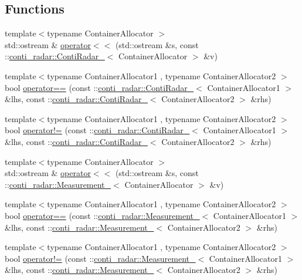\subsection*{Functions}
\begin{DoxyCompactItemize}
\item 
{\footnotesize template$<$typename Container\+Allocator $>$ }\\std\+::ostream \& \hyperlink{namespaceconti__radar_a45fbce01f8d975cd105ce47904567933}{operator$<$$<$} (std\+::ostream \&s, const \+::\hyperlink{structconti__radar_1_1ContiRadar__}{conti\+\_\+radar\+::\+Conti\+Radar\+\_\+}$<$ Container\+Allocator $>$ \&v)
\item 
{\footnotesize template$<$typename Container\+Allocator1 , typename Container\+Allocator2 $>$ }\\bool \hyperlink{namespaceconti__radar_a02b979557924ab172d8ffb8c385a04e4}{operator==} (const \+::\hyperlink{structconti__radar_1_1ContiRadar__}{conti\+\_\+radar\+::\+Conti\+Radar\+\_\+}$<$ Container\+Allocator1 $>$ \&lhs, const \+::\hyperlink{structconti__radar_1_1ContiRadar__}{conti\+\_\+radar\+::\+Conti\+Radar\+\_\+}$<$ Container\+Allocator2 $>$ \&rhs)
\item 
{\footnotesize template$<$typename Container\+Allocator1 , typename Container\+Allocator2 $>$ }\\bool \hyperlink{namespaceconti__radar_a655b3a6c63e06866d91dc3f1947631e2}{operator!=} (const \+::\hyperlink{structconti__radar_1_1ContiRadar__}{conti\+\_\+radar\+::\+Conti\+Radar\+\_\+}$<$ Container\+Allocator1 $>$ \&lhs, const \+::\hyperlink{structconti__radar_1_1ContiRadar__}{conti\+\_\+radar\+::\+Conti\+Radar\+\_\+}$<$ Container\+Allocator2 $>$ \&rhs)
\item 
{\footnotesize template$<$typename Container\+Allocator $>$ }\\std\+::ostream \& \hyperlink{namespaceconti__radar_a0d0d9b62186db990827f43426ec8aa39}{operator$<$$<$} (std\+::ostream \&s, const \+::\hyperlink{structconti__radar_1_1Measurement__}{conti\+\_\+radar\+::\+Measurement\+\_\+}$<$ Container\+Allocator $>$ \&v)
\item 
{\footnotesize template$<$typename Container\+Allocator1 , typename Container\+Allocator2 $>$ }\\bool \hyperlink{namespaceconti__radar_a51b035c16eb15a241d4ef92bc689932a}{operator==} (const \+::\hyperlink{structconti__radar_1_1Measurement__}{conti\+\_\+radar\+::\+Measurement\+\_\+}$<$ Container\+Allocator1 $>$ \&lhs, const \+::\hyperlink{structconti__radar_1_1Measurement__}{conti\+\_\+radar\+::\+Measurement\+\_\+}$<$ Container\+Allocator2 $>$ \&rhs)
\item 
{\footnotesize template$<$typename Container\+Allocator1 , typename Container\+Allocator2 $>$ }\\bool \hyperlink{namespaceconti__radar_ae82ecbb25e59ba5d52a7cf38e85d4780}{operator!=} (const \+::\hyperlink{structconti__radar_1_1Measurement__}{conti\+\_\+radar\+::\+Measurement\+\_\+}$<$ Container\+Allocator1 $>$ \&lhs, const \+::\hyperlink{structconti__radar_1_1Measurement__}{conti\+\_\+radar\+::\+Measurement\+\_\+}$<$ Container\+Allocator2 $>$ \&rhs)
\end{DoxyCompactItemize}


